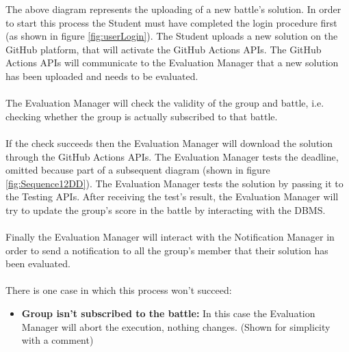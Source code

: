 \documentclass{article}
\begin{document}
{        The above diagram represents the uploading of a new battle's solution.
        In order to start this process the Student must have 
        completed the login procedure first (as shown in figure \ref{fig:userLogin}).
        The Student uploads a new solution on the GitHub platform, that will activate the GitHub
        Actions APIs. The GitHub Actions APIs will communicate to the Evaluation Manager
        that a new solution has been uploaded and needs to be evaluated.
        \\ \\
        The Evaluation Manager will check the validity of the group and battle,
        i.e. checking whether the group is actually subscribed to that battle.
        \\ \\
        If the check succeeds then the Evaluation Manager will download the
        solution through the GitHub Actions APIs.
        The Evaluation Manager tests the deadline, omitted because part
        of a subsequent diagram (shown in figure \ref{fig:Sequence12DD}).
        The Evaluation Manager tests the solution by passing it to the Testing APIs.
        After receiving the test's result, the Evaluation Manager will
        try to update the group's score in the battle by interacting with the DBMS.
        \\ \\
        Finally the Evaluation Manager will interact with the
        Notification Manager in order to send a notification to all the
        group's member that their solution has been evaluated.
        \\ \\
        There is one case in which this process won't succeed:        
        \begin{itemize}
            \item \textbf{Group isn't subscribed to the battle:} In this case the Evaluation Manager 
            will abort the execution, nothing changes. (Shown for simplicity with a comment)
          \end{itemize}

}
\end{document}
